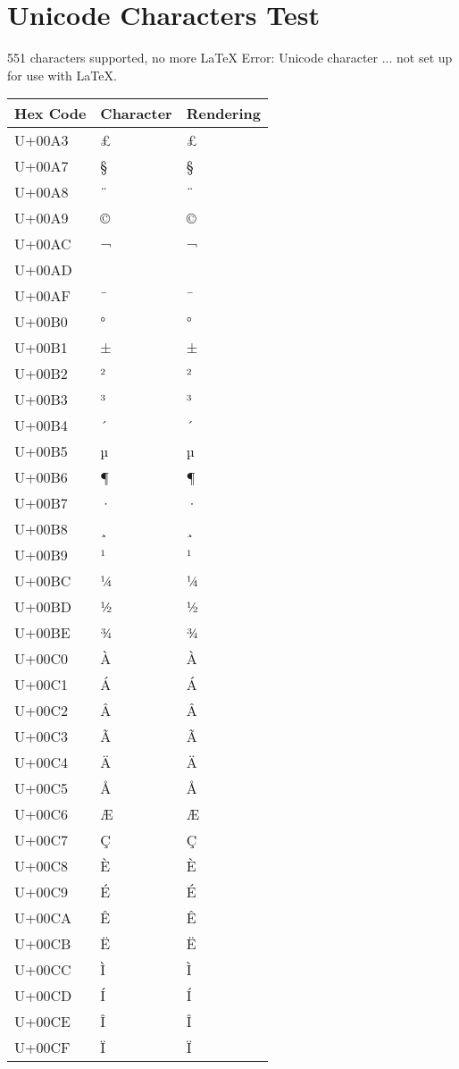 \documentclass{article}
\begin{document}
\section*{Unicode Characters Test}

551 characters supported, no more LaTeX Error: Unicode character ... not set up for use with LaTeX.

\begin{longtable}{lll}
Hex Code & Character & Rendering \\
\hline
U+00A3 & £ & £ \\
U+00A7 & § & § \\
U+00A8 & ¨ & ¨ \\
U+00A9 & © & © \\
U+00AC & ¬ & ¬ \\
U+00AD & ­ & ­ \\
U+00AF & ¯ & ¯ \\
U+00B0 & ° & ° \\
U+00B1 & ± & ± \\
U+00B2 & ² & ² \\
U+00B3 & ³ & ³ \\
U+00B4 & ´ & ´ \\
U+00B5 & µ & µ \\
U+00B6 & ¶ & ¶ \\
U+00B7 & · & · \\
U+00B8 & ¸ & ¸ \\
U+00B9 & ¹ & ¹ \\
U+00BC & ¼ & ¼ \\
U+00BD & ½ & ½ \\
U+00BE & ¾ & ¾ \\
U+00C0 & À & À \\
U+00C1 & Á & Á \\
U+00C2 & Â & Â \\
U+00C3 & Ã & Ã \\
U+00C4 & Ä & Ä \\
U+00C5 & Å & Å \\
U+00C6 & Æ & Æ \\
U+00C7 & Ç & Ç \\
U+00C8 & È & È \\
U+00C9 & É & É \\
U+00CA & Ê & Ê \\
U+00CB & Ë & Ë \\
U+00CC & Ì & Ì \\
U+00CD & Í & Í \\
U+00CE & Î & Î \\
U+00CF & Ï & Ï \\

\end{longtable}
\end{document}
